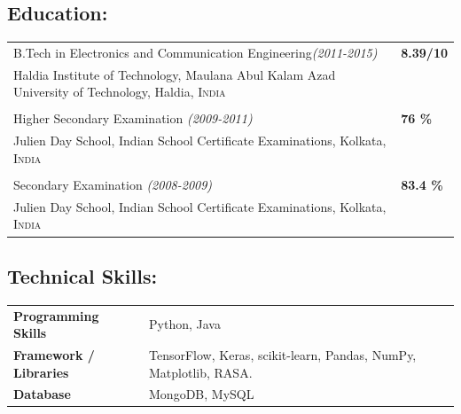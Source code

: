 \documentclass[8pt]{article}
\newcommand{\tn}{\tabularnewline}
\begin{document}
\subsection*{Education:}
\vspace{-0.2cm}
\begin{supertabular}{p{0.8\textwidth}!{\color{lightgrey}\vrule}p{0.2\textwidth}}
B.Tech in Electronics and Communication Engineering\textit{(2011-2015)}
&
\textbf{8.39/10}\\
Haldia Institute of Technology, Maulana Abul Kalam Azad University of Technology, Haldia, \textsc{India}\\\\

Higher Secondary Examination \textit{(2009-2011)}
&
\textbf{76 \%}\\
Julien Day School, Indian School Certificate Examinations, Kolkata, \textsc{India}\\
\\
Secondary Examination \textit{(2008-2009)}
&
\textbf{83.4 \%}\\
Julien Day School, Indian School Certificate Examinations, Kolkata, \textsc{India}\\
\end{supertabular}

\vspace{-2mm}

\subsection*{Technical Skills:}
\vspace{-0.2cm}
\begin{supertabular}{l l}
\textbf{Programming Skills} & Python, Java\tn
\textbf{Framework / Libraries} & TensorFlow, Keras, scikit-learn, Pandas, NumPy, Matplotlib, RASA.\tn
\textbf{Database} & MongoDB, MySQL \tn
\end{supertabular}
\end{document}
